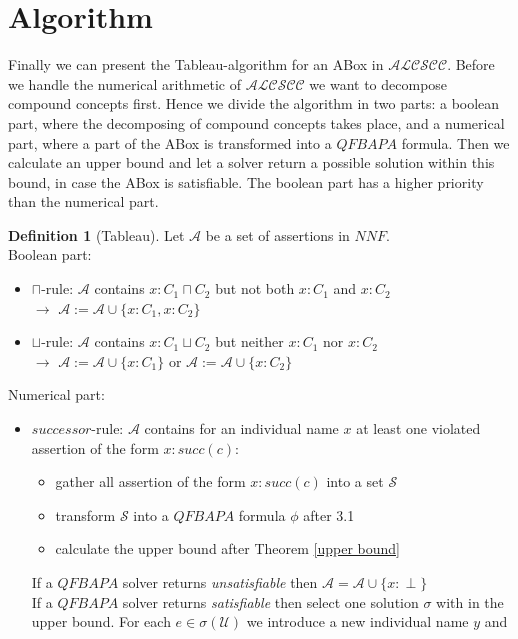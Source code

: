 \documentclass{book}
\theoremstyle{break}
\theoremstyle{definition}
\newtheorem{mydef}{Definition}
\begin{document}
\section{Algorithm}\label{Tableau}
Finally we can present the Tableau-algorithm for an ABox in $\mathcal{ALCSCC}$. Before we handle the numerical arithmetic of $\mathcal{ALCSCC}$ we want to decompose compound concepts first. Hence we divide the algorithm in two parts: a boolean part, where the decomposing of compound concepts takes place, and a numerical part, where a part of the ABox is transformed into a $QFBAPA$ formula. Then we calculate an upper bound and let a solver return a possible solution within this bound, in case the ABox is satisfiable. The boolean part has a higher priority than the numerical part. 
\begin{mydef}[Tableau]
Let $\mathcal{A}$ be a set of assertions in $NNF$.\\
Boolean part:
\begin{itemize}
\item\label{cap} $\sqcap$-rule: $\mathcal{A}$ contains $x:C_1\sqcap C_2$ but not both $x:C_1$ and $x:C_2$\\
$\rightarrow$ $\mathcal{A}:=\mathcal{A}\cup\{x:C_1, x:C_2\}$
\item\label{cup} $\sqcup$-rule: $\mathcal{A}$ contains $x:C_1\sqcup C_2$ but neither $x:C_1$ nor $x:C_2$\\
$\rightarrow$ $\mathcal{A}:=\mathcal{A}\cup\{x:C_1\}$ or $\mathcal{A}:=\mathcal{A}\cup\{x:C_2\}$
\end{itemize}
Numerical part:
\begin{itemize}
\item\label{succ} $successor$-rule: $\mathcal{A}$ contains for an individual name $x$ at least one violated assertion of the form $x:succ(c)$:
\begin{itemize}
\item gather all assertion of the form $x:succ(c)$ into a set $\mathcal{S}$
\item transform $\mathcal{S}$ into a $QFBAPA$ formula $\phi$ after 3.1
\item calculate the upper bound after Theorem \ref{upper bound}
\end{itemize}
If a $QFBAPA$ solver returns \textit{unsatisfiable} then $\mathcal{A}=\mathcal{A}\cup\{x:\perp\}$\\
If a $QFBAPA$ solver returns \textit{satisfiable} then select one solution $\sigma$ with in the upper bound. For each $e\in\sigma(\mathcal{U})$ we introduce a new individual name $y$ and

\end{itemize}
\end{mydef}
\end{document}
